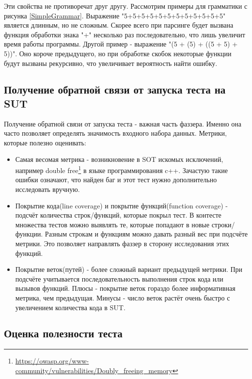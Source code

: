 \documentclass[a4paper]{article}
\begin{document}
Эти свойства не противоречат друг другу. Рассмотрим примеры для грамматики с рисунка \ref{SimpleGrammar}. Выражение "5+5+5+5+5+5+5+5+5+5+5+5" является длинным, но не сложным. Скорее всего при парсинге будет вызвана функция обработки знака "+" несколько раз последовательно, что лишь увеличит время работы программы. Другой пример - выражение "(5 + (5) + ((5 + 5) + 5))". Оно короче предыдущего, но при обработке скобок некоторые функции будут вызваны рекурсивно, что увеличивает вероятность найти ошибку.

\subsection{Получение обратной связи от запуска теста на SUT}
\indent

Получение обратной связи от запуска теста - важная часть фаззера. Именно она часто позволяет определять значимость входного набора данных. Метрики, которые полезно оценивать:

\begin{itemize}
\item Самая весомая метрика - возникновение в SOT искомых исключений,
например double free\footnote[1]{\href{https://owasp.org/www-community/vulnerabilities/Doubly\_freeing\_memory}{https://owasp.org/www-community/vulnerabilities/Doubly\_freeing\_memory}} в языке программирования c++. Зачастую такие ошибки означают, что найден баг и этот тест нужно дополнительно исследовать вручную.
\item Покрытие кода(line coverage) и покрытие функций(function coverage) - подсчёт количества строк/функций, которые покрыл тест. В контесте множества тестов можно выявлять те, которые попадают в новые строки/функции. Разным строкам и функциям можно давать разный вес при подсчёте метрики. Это позволяет направлять фаззер в сторону исследования этих функций.
\item Покрытие веток(путей) - более сложный вариант предыдущей метрики. При подсчёте учитывается последовательность выполнения строк кода или вызывов функций. Плюсы - покрытие веток гораздо более информативная метрика, чем предыдущая. Минусы - число веток растёт очень быстро с увеличением количества кода в SUT.
\end{itemize}

\subsection{Оценка полезности теста}
\indent
\end{document}
